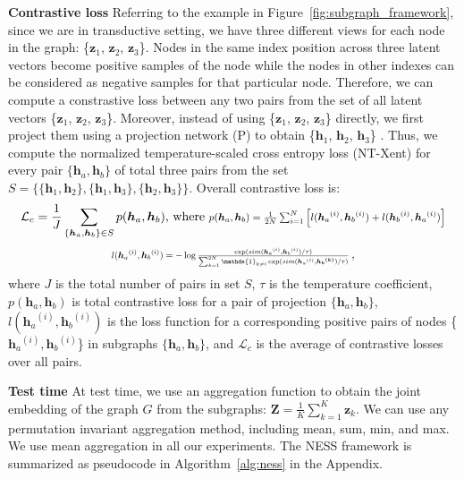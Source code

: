 \documentclass{article}
\begin{document}
\textbf{Contrastive loss}
Referring to the example in Figure~\ref{fig:subgraph_framework}, since we are in transductive setting, we have three different views for each node in the graph: \{$\bm{z}_1$, $\bm{z}_2$, $\bm{z}_3$\}. Nodes in the same index position across three latent vectors become positive samples of the node while the nodes in other indexes can be considered as negative samples for that particular node. Therefore, we can compute a constrastive loss between any two pairs from the set of all latent vectors \{$\bm{z}_1$, $\bm{z}_2$, $\bm{z}_3$\}. Moreover, instead of using \{$\bm{z}_1$, $\bm{z}_2$, $\bm{z}_3$\} directly, we first project them using a projection network (P) to obtain \{$\bm{h}_1$, $\bm{h}_2$, $\bm{h}_3$\} \citep{chen2020simple}. Thus, we compute the normalized temperature-scaled cross entropy loss (NT-Xent) \citep{chen2020simple} for every pair $\{\bm{h}_a, \bm{h}_b\}$ of total three pairs from the set $S=\{\{\bm{h}_1, \bm{h}_2\},\{\bm{h}_1, \bm{h}_3\},\{\bm{h}_2, \bm{h}_3\}\}$. Overall contrastive loss is: 
\begin{equation}\label{eq4}
\mathcal{L}_c = \frac{1}{J}\sum_{\{\bm{h}_a,\bm{h}_b\}\in S}p(\bm{h}_a,\bm{h}_b) \mbox{, where  } \resizebox{0.55\textwidth}{!}{$p(\bm{h}_a,\bm{h}_b)=\frac{1}{2N}\sum_{i=1}^{N}\left[l({\bm{h}_a}^{(i)}, {\bm{h}_b}^{(i)}) + l({\bm{h}_b}^{(i)}, {\bm{h}_a}^{(i)})\right]$}
\end{equation} 
\begin{equation}\label{eq6}
\resizebox{0.55\textwidth}{!}{$l({\bm{h}_a}^{(i)}, {\bm{h}_b}^{(i)})=-\log\frac{\exp(sim({\bm{h}_a}^{(i)},{\bm{h}_b}^{(i)})/\tau)}{\sum_{k=1}^{2N} \mathds{1}_{k \neq i} \exp(sim({\bm{h}_a}^{(i)}, \bm{{h_b}^{(k)}})/\tau)}$}\,,
\end{equation} 
where $J$ is the total number of pairs in set $S$, $\tau$ is the temperature coefficient, $p(\bm{h}_a,\bm{h}_b)$ is total contrastive loss for a pair of projection $\{\bm{h}_a, \bm{h}_b\}$, $l({\bm{h}_a}^{(i)}, {\bm{h}_b}^{(i)})$ is the loss function for a corresponding positive pairs of nodes \{${\bm{h}_a}^{(i)}, {\bm{h}_b}^{(i)}$\} in subgraphs $\{\bm{h}_a, \bm{h}_b\}$, and $\mathcal{L}_c$ is the average of contrastive losses over all pairs. 

\textbf{Test time}
At test time, we use an aggregation function to obtain the joint embedding of the graph $G$ from the subgraphs: $\bm{Z}=\frac{1}{K}\sum_{k=1}^{K} \bm{z}_k$. We can use any permutation invariant aggregation method, including mean, sum, min, and max. We use mean aggregation in all our experiments. The NESS framework is summarized as pseudocode in Algorithm~\ref{alg:ness} in the Appendix.
\end{document}
